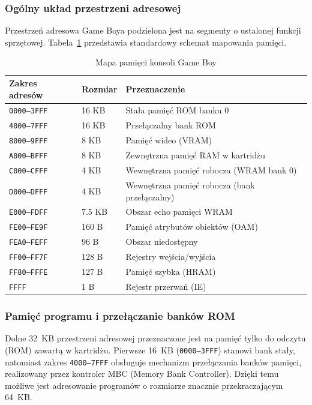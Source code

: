 \documentclass{article}
\begin{document}
\subsubsection{Ogólny układ przestrzeni adresowej}

Przestrzeń adresowa Game Boya podzielona jest na segmenty o ustalonej funkcji sprzętowej. Tabela~\ref{tab:gb_memory_map} przedstawia standardowy schemat mapowania pamięci.

\begin{table}[h]
	\centering
	\begin{tabular}{lll}
		\hline
		Zakres adresów & Rozmiar & Przeznaczenie \\
		\hline
		\texttt{0000--3FFF} & 16 KB & Stała pamięć ROM banku 0 \\
		\texttt{4000--7FFF} & 16 KB & Przełączalny bank ROM \\
		\texttt{8000--9FFF} & 8 KB  & Pamięć wideo (VRAM) \\
		\texttt{A000--BFFF} & 8 KB  & Zewnętrzna pamięć RAM w kartridżu \\
		\texttt{C000--CFFF} & 4 KB  & Wewnętrzna pamięć robocza (WRAM bank 0) \\
		\texttt{D000--DFFF} & 4 KB  & Wewnętrzna pamięć robocza (bank przełączalny) \\
		\texttt{E000--FDFF} & 7.5 KB & Obszar echo pamięci WRAM \\
		\texttt{FE00--FE9F} & 160 B & Pamięć atrybutów obiektów (OAM) \\
		\texttt{FEA0--FEFF} & 96 B  & Obszar niedostępny \\
		\texttt{FF00--FF7F} & 128 B & Rejestry wejścia/wyjścia \\
		\texttt{FF80--FFFE} & 127 B & Pamięć szybka (HRAM) \\
		\texttt{FFFF}       & 1 B   & Rejestr przerwań (IE) \\
		\hline
	\end{tabular}
	\caption{Mapa pamięci konsoli Game Boy \cite{pandocs}}
	\label{tab:gb_memory_map}
\end{table}

\subsubsection{Pamięć programu i przełączanie banków ROM}

Dolne 32~KB przestrzeni adresowej przeznaczone jest na pamięć tylko do odczytu (ROM) zawartą w kartridżu. Pierwsze 16~KB (\texttt{0000--3FFF}) stanowi bank stały, natomiast zakres \texttt{4000--7FFF} obsługuje mechanizm przełączania banków pamięci, realizowany przez kontroler MBC (Memory Bank Controller). Dzięki temu możliwe jest adresowanie programów o rozmiarze znacznie przekraczającym 64~KB.
\end{document}
